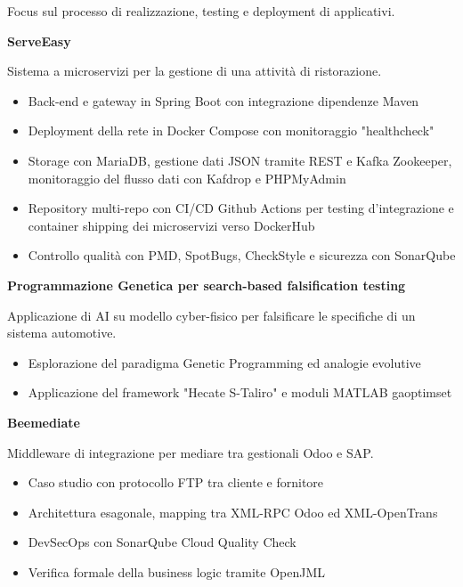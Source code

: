 \documentclass[a4paper]{letter}
\begin{document}
\begin{minipage}[t]{0.65\textwidth}
Focus sul processo di realizzazione, testing e deployment di applicativi.

\vspace{2 mm}
{\large \textbf{ServeEasy}}

{\small Sistema a microservizi per la gestione di una attività di ristorazione. }

\vspace{1 mm}
\begin{itemize}
    \item Back-end e gateway in Spring Boot con integrazione dipendenze Maven
    \item Deployment della rete in Docker Compose con monitoraggio "healthcheck"
    \item Storage con MariaDB, gestione dati JSON tramite REST e Kafka Zookeeper, monitoraggio del flusso dati con Kafdrop e PHPMyAdmin
    \item Repository multi-repo con CI/CD Github Actions per testing d'integrazione e container shipping dei microservizi verso DockerHub
    \item Controllo qualità con PMD, SpotBugs, CheckStyle e sicurezza con SonarQube
\end{itemize}

\vspace{1 mm}
{\large \textbf{Programmazione Genetica per search-based falsification testing}}

{\small Applicazione di AI su modello cyber-fisico per falsificare le specifiche di un sistema automotive. }

\vspace{1 mm}
\begin{itemize}
    \item Esplorazione del paradigma Genetic Programming ed analogie evolutive
    \item Applicazione del framework "Hecate S-Taliro" e moduli MATLAB gaoptimset
\end{itemize}

\vspace{1 mm}
{\large \textbf{Beemediate}}

{\small Middleware di integrazione per mediare tra gestionali Odoo e SAP.}

\vspace{1 mm}
\begin{itemize}
    \item Caso studio con protocollo FTP tra cliente e fornitore
    \item Architettura esagonale, mapping tra XML-RPC Odoo ed XML-OpenTrans
    \item DevSecOps con SonarQube Cloud Quality Check
    \item Verifica formale della business logic tramite OpenJML 
\end{itemize}

\end{minipage}
\end{document}
